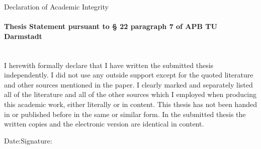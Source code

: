 \begin{minipage}[c][4em][t]{\textwidth}
\fontsize{14pt}{1.2}\selectfont
Declaration of Academic Integrity
\end{minipage}
\vspace{11pt}
\paragraph{Thesis Statement pursuant to § 22 paragraph 7 of APB TU Darmstadt}\noindent\\
I herewith formally declare that I have written the submitted thesis independently. I did not use any outside support except for the quoted literature and other sources mentioned in the paper. I clearly marked and separately listed all of the literature and all of the other sources which I employed when producing this academic work, either literally or in content. This thesis has not been handed in or published before in the same or similar form.\newline
In the submitted thesis the written copies and the electronic version are identical in content.\vspace{40pt}

\noindent Date:\hspace{0.4\textwidth}Signature:
\vspace*{2cm}